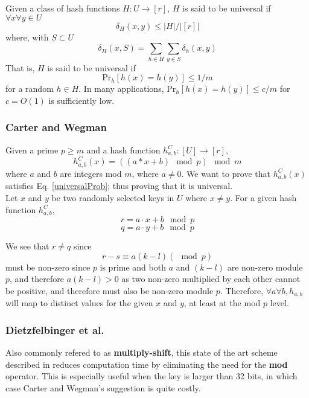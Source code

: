\documentclass[../../main.tex]{subfiles}
\begin{document}
\noindent Given a class of hash functions $H:U\rightarrow [r]$, $H$ is said to be universal if $\forall x \forall y \in U$
$$
	\delta_H (x,y) \leq |H|/|[r]|
$$
where, with $S\subset U$
$$
\delta_H (x,S) = \sum_{h\in H}\sum_{y\in S} \delta_h(x,y)
$$
That is, $H$ is said to be universal if 
\begin{equation}\label{universalProb}
\mathrm{Pr}_h[h(x)=h(y)]\leq 1/m
\end{equation}
for a random $h \in H$.
 In many applications, Pr$_h[h(x)=h(y)]\leq c/m$ for $c=O(1)$ is sufficiently low.

\subsubsection*{Carter and Wegman\cite{carterWegman}}
Given a prime $p\geq m$ and a hash function $h_{a,b}^C:[U]\rightarrow [r]$,
\begin{equation}\label{carterhash}
h_{a,b}^{C}(x)=((a*x + b) \mod p) \mod m
\end{equation}
where $a$ and $b$ are integers mod $m$, where $a\neq 0$. We want to prove that $h_{a,b}^{C}(x)$ satisfies Eq. \ref{universalProb}; thus proving that it is universal.\\

\noindent Let $x$ and $y$ be two randomly selected keys in $U$ where $x\neq y$. For a given hash function $h_{a,b}^{C}$,
$$
r = a\cdot x + b \mod p
$$
$$
q = a \cdot y + b \mod p
$$

\noindent We see that $r\neq q$ since 
$$
r - s \equiv a(k-l) (\mod p)
$$
must be non-zero since $p$ is prime and both $a$ and $(k-l)$ are non-zero module $p$, and therefore $a(k-l) > 0$ as two non-zero multiplied by each other cannot be positive, and therefore must also be non-zero module $p$.
Therefore, $\forall a\forall b, h_{a,b}$ will map to distinct values for the given $x$ and $y$, at least at the mod $p$ level.\\



\subsubsection*{Dietzfelbinger et al.\cite{Dietzfelbinger}}
Also commonly refered to as \textbf{multiply-shift}, this state of the art scheme described in \cite{Dietzfelbinger} reduces computation time by eliminating the need for the \textbf{mod} operator. This is especially useful when the key is larger than 32 bits, in which case Carter and Wegman's suggestion is quite costly\cite{dikuHash}.\\
\end{document}
